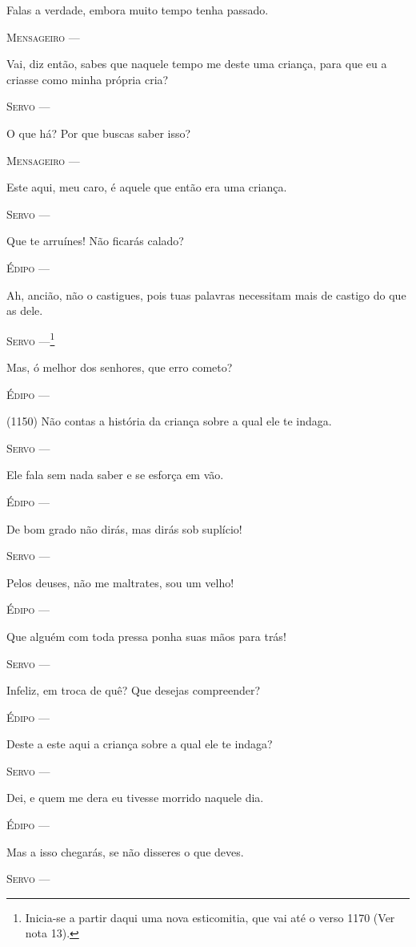Falas a verdade, embora muito tempo tenha passado.

\textsc{Mensageiro} ---

Vai, diz então, sabes que naquele tempo me deste uma criança, para que
eu a criasse como minha própria cria?

\textsc{Servo} ---

O que há? Por que buscas saber isso?

\textsc{Mensageiro} ---

Este aqui, meu caro, é aquele que então era uma criança.

\textsc{Servo} ---

Que te arruínes! Não ficarás calado?

\textsc{Édipo} ---

Ah, ancião, não o castigues, pois tuas palavras necessitam mais de
castigo do que as dele.

\textsc{Servo} ---\footnote{Inicia-se a partir daqui uma nova esticomitia,
  que vai até o verso 1170 (Ver nota 13).}

Mas, ó melhor dos senhores, que erro cometo?

\textsc{Édipo} ---

(1150) Não contas a história da criança sobre a qual ele te indaga.

\textsc{Servo} ---

Ele fala sem nada saber e se esforça em vão.

\textsc{Édipo} ---

De bom grado não dirás, mas dirás sob suplício!

\textsc{Servo} ---

Pelos deuses, não me maltrates, sou um velho!

\textsc{Édipo} ---

Que alguém com toda pressa ponha suas mãos para trás!

\textsc{Servo} ---

Infeliz, em troca de quê? Que desejas compreender?

\textsc{Édipo} ---

Deste a este aqui a criança sobre a qual ele te indaga?

\textsc{Servo} ---

Dei, e quem me dera eu tivesse morrido naquele dia.

\textsc{Édipo} ---

Mas a isso chegarás, se não disseres o que deves.

\textsc{Servo} ---

